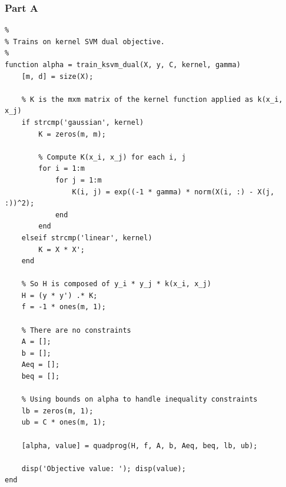 \documentclass[11pt, oneside]{article}   	%
\begin{document}
\subsubsection{Part A}
\begin{verbatim}
%
% Trains on kernel SVM dual objective.
%
function alpha = train_ksvm_dual(X, y, C, kernel, gamma)
    [m, d] = size(X);
    
    % K is the mxm matrix of the kernel function applied as k(x_i, x_j)
    if strcmp('gaussian', kernel)
        K = zeros(m, m);
        
        % Compute K(x_i, x_j) for each i, j
        for i = 1:m
            for j = 1:m
                K(i, j) = exp((-1 * gamma) * norm(X(i, :) - X(j, :))^2);
            end
        end
    elseif strcmp('linear', kernel)
        K = X * X';
    end
    
    % So H is composed of y_i * y_j * k(x_i, x_j)
    H = (y * y') .* K;
    f = -1 * ones(m, 1);
    
    % There are no constraints
    A = [];
    b = [];
    Aeq = [];
    beq = [];
    
    % Using bounds on alpha to handle inequality constraints
    lb = zeros(m, 1);
    ub = C * ones(m, 1);
    
    [alpha, value] = quadprog(H, f, A, b, Aeq, beq, lb, ub);
    
    disp('Objective value: '); disp(value);
end
\end{verbatim}
\end{document}
